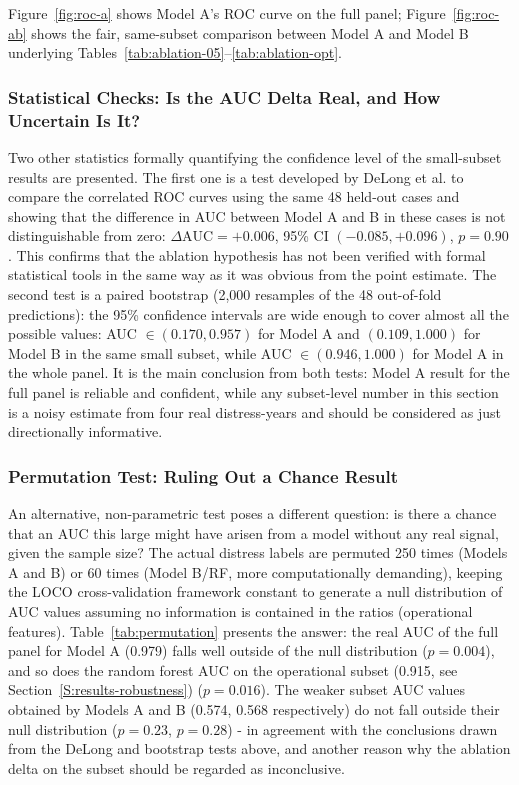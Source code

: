 \documentclass[final,1p,times]{elsarticle}
\begin{document}
Figure~\ref{fig:roc-a} shows Model A's ROC curve on the full panel; Figure~\ref{fig:roc-ab} shows the fair, same-subset comparison between Model A and Model B underlying Tables~\ref{tab:ablation-05}--\ref{tab:ablation-opt}.

\subsubsection{Statistical Checks: Is the AUC Delta Real, and How Uncertain Is It?}

Two other statistics formally quantifying the confidence level of the small-subset results are presented. The first one is a test developed by DeLong et al. to compare the correlated ROC curves using the same 48 held-out cases and showing that the difference in AUC between Model A and B in these cases is not distinguishable from zero: $\Delta \text{AUC} = +0.006$, 95\% CI $(-0.085, +0.096)$, $p = 0.90$. This confirms that the ablation hypothesis has not been verified with formal statistical tools in the same way as it was obvious from the point estimate. The second test is a paired bootstrap (2,000 resamples of the 48 out-of-fold predictions): the 95\% confidence intervals are wide enough to cover almost all the possible values: AUC $\in (0.170, 0.957)$ for Model A and $(0.109, 1.000)$ for Model B in the same small subset, while AUC $\in (0.946, 1.000)$ for Model A in the whole panel. It is the main conclusion from both tests: Model A result for the full panel is reliable and confident, while any subset-level number in this section is a noisy estimate from four real distress-years and should be considered as just directionally informative.

\subsubsection{Permutation Test: Ruling Out a Chance Result}

An alternative, non-parametric test poses a different question: is there a chance that an AUC this large might have arisen from a model without any real signal, given the sample size? The actual distress labels are permuted 250 times (Models A and B) or 60 times (Model B/RF, more computationally demanding), keeping the LOCO cross-validation framework constant to generate a null distribution of AUC values assuming no information is contained in the ratios (operational features). Table~\ref{tab:permutation} presents the answer: the real AUC of the full panel for Model A (0.979) falls well outside of the null distribution ($p = 0.004$), and so does the random forest AUC on the operational subset (0.915, see Section~\ref{S:results-robustness}) ($p = 0.016$). The weaker subset AUC values obtained by Models A and B (0.574, 0.568 respectively) do not fall outside their null distribution ($p = 0.23$, $p = 0.28$) - in agreement with the conclusions drawn from the DeLong and bootstrap tests above, and another reason why the ablation delta on the subset should be regarded as inconclusive.
\end{document}
